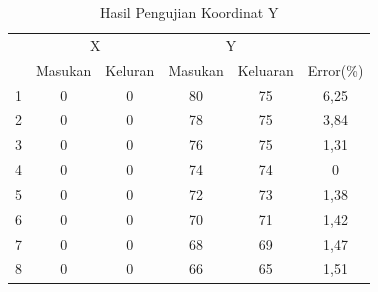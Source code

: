  \begin{table}[]
 	\centering
 	\caption{Hasil Pengujian Koordinat Y}
 	\label{tbl.koordinaty}
 	\begin{tabular}{|c|c|c|c|c|c|}
 		\hline
 		\rowcolor[HTML]{9B9B9B} 
 		\cellcolor[HTML]{9B9B9B}                     & \multicolumn{2}{c|}{\cellcolor[HTML]{9B9B9B}X} & \multicolumn{2}{c|}{\cellcolor[HTML]{9B9B9B}Y} & \cellcolor[HTML]{9B9B9B}                           \\ \cline{2-5}
 		\rowcolor[HTML]{9B9B9B} 
 		\multirow{-2}{*}{\cellcolor[HTML]{9B9B9B}No} & Masukan                & Keluran               & Masukan               & Keluaran               & \multirow{-2}{*}{\cellcolor[HTML]{9B9B9B}Error(\%)} \\ \hline
 			1                                            & 0                      & 0                     & 80                    & 75                     & 6,25                                               \\ \hline
 			2                                            & 0                      & 0                     & 78                    & 75                     & 3,84                                        \\ \hline
 			3                                            & 0                      & 0                     & 76                    & 75                     & 1,31                                        \\ \hline
 			4                                            & 0                      & 0                     & 74                    & 74                     & 0                                                  \\ \hline
 			5                                            & 0                      & 0                     & 72                    & 73                     & 1,38                                        \\ \hline
 			6                                            & 0                      & 0                     & 70                    & 71                     & 1,42                                       \\ \hline
 			7                                            & 0                      & 0                     & 68                    & 69                     & 1,47                                        \\ \hline
 			8                                            & 0                      & 0                     & 66                    & 65                     & 1,51                                        \\ \hline

\end{tabular}
\end{table}
